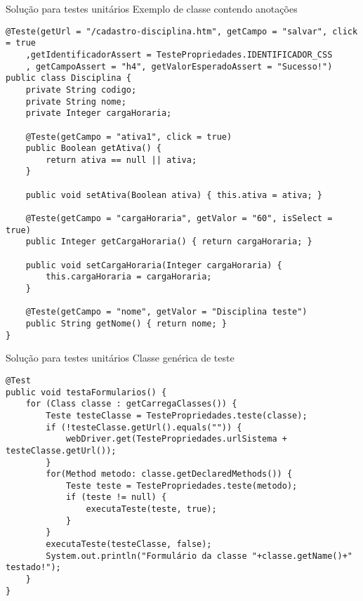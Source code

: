 \documentclass{beamer}
\begin{document}
\begin{frame}[fragile]{Solução para testes unitários}
    Exemplo de classe contendo anotações
    \begin{lstlisting}
@Teste(getUrl = "/cadastro-disciplina.htm", getCampo = "salvar", click = true
    ,getIdentificadorAssert = TestePropriedades.IDENTIFICADOR_CSS
    , getCampoAssert = "h4", getValorEsperadoAssert = "Sucesso!")
public class Disciplina {
    private String codigo;
    private String nome;
    private Integer cargaHoraria;

    @Teste(getCampo = "ativa1", click = true)
    public Boolean getAtiva() {
        return ativa == null || ativa;
    }

    public void setAtiva(Boolean ativa) { this.ativa = ativa; }

    @Teste(getCampo = "cargaHoraria", getValor = "60", isSelect = true)
    public Integer getCargaHoraria() { return cargaHoraria; }

    public void setCargaHoraria(Integer cargaHoraria) {
        this.cargaHoraria = cargaHoraria;
    }

    @Teste(getCampo = "nome", getValor = "Disciplina teste")
    public String getNome() { return nome; }
}
	\end{lstlisting}
\end{frame}
\begin{frame}[fragile]{Solução para testes unitários}
    Classe genérica de teste
    \begin{lstlisting}
@Test
public void testaFormularios() {
    for (Class classe : getCarregaClasses()) {
        Teste testeClasse = TestePropriedades.teste(classe);
        if (!testeClasse.getUrl().equals("")) {
            webDriver.get(TestePropriedades.urlSistema + testeClasse.getUrl());
        }
        for(Method metodo: classe.getDeclaredMethods()) {
            Teste teste = TestePropriedades.teste(metodo);
            if (teste != null) {
                executaTeste(teste, true);
            }
        }
        executaTeste(testeClasse, false);
        System.out.println("Formulário da classe "+classe.getName()+" testado!");
    }
}
	\end{lstlisting}
\end{frame}
\end{document}
